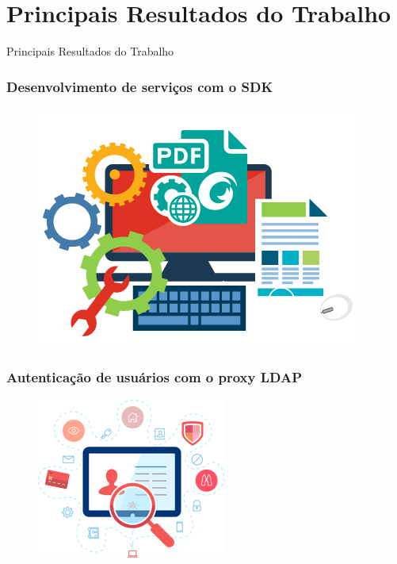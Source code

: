 \documentclass{beamer}
\begin{document}



\section{Principais Resultados do Trabalho}


\begin{frame}[c]{ }
\centering
  \huge{Principais Resultados do Trabalho}
\end{frame}



\begin{frame}
  \frametitle{Desenvolvimento de serviços com o SDK}

	\begin{figure}
	\centering
		\includegraphics[scale=0.4]{img/sdk.png}
	\end{figure}
  
\end{frame}


\begin{frame}
  \frametitle{Autenticação de usuários com o proxy LDAP}

	\begin{figure}
	\centering
		\includegraphics[scale=0.6]{img/ldap.png}
	\end{figure}
  
\end{frame}
\end{document}
